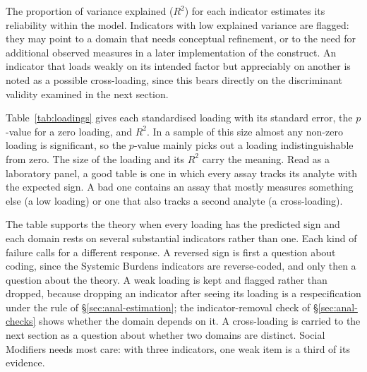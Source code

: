 The proportion of variance explained ($R^2$) for each indicator estimates its reliability within the model. Indicators with low explained variance are flagged: they may point to a domain that needs conceptual refinement, or to the need for additional observed measures in a later implementation of the construct. An indicator that loads weakly on its intended factor but appreciably on another is noted as a possible cross-loading, since this bears directly on the discriminant validity examined in the next section.

Table~\ref{tab:loadings} gives each standardised loading with its standard error, the $p$-value for a zero loading, and $R^2$. In a sample of this size almost any non-zero loading is significant, so the $p$-value mainly picks out a loading indistinguishable from zero. The size of the loading and its $R^2$ carry the meaning. Read as a laboratory panel, a good table is one in which every assay tracks its analyte with the expected sign. A bad one contains an assay that mostly measures something else (a low loading) or one that also tracks a second analyte (a cross-loading).

The table supports the theory when every loading has the predicted sign and each domain rests on several substantial indicators rather than one. Each kind of failure calls for a different response. A reversed sign is first a question about coding, since the Systemic Burdens indicators are reverse-coded, and only then a question about the theory. A weak loading is kept and flagged rather than dropped, because dropping an indicator after seeing its loading is a respecification under the rule of \S\ref{sec:anal-estimation}; the indicator-removal check of \S\ref{sec:anal-checks} shows whether the domain depends on it. A cross-loading is carried to the next section as a question about whether two domains are distinct. Social Modifiers needs most care: with three indicators, one weak item is a third of its evidence.


